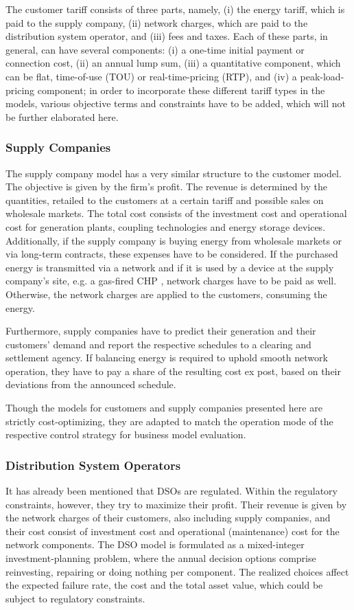 \documentclass[review]{elsarticle}
\begin{document}
The customer tariff consists of three parts, namely, (i) the energy
tariff, which is paid to the supply company, (ii) network charges,
which are paid to the distribution system operator, and (iii) fees and
taxes. Each of these parts, in general, can have several components:
(i) a one-time initial payment or connection cost, (ii) an annual lump
sum, (iii) a quantitative component, which can be flat, time-of-use (TOU) or real-time-pricing (RTP),
and (iv) a peak-load-pricing component; in order to incorporate these
different tariff types in the models, various objective terms and
constraints have to be added, which will not be further elaborated
here. 

\subsubsection{Supply Companies}
The supply company model has a very similar structure to the customer
model. The objective is given by the firm’s profit. The revenue is
determined by the quantities, retailed to the customers at a certain tariff
and possible sales on
wholesale markets.
The
total cost consists of the investment cost and operational cost for
generation plants, coupling technologies and energy storage
devices. Additionally, if the supply company is buying energy from
wholesale markets or via long-term contracts, these expenses have to
be considered. If the purchased energy is transmitted via a network
and if it is used by a device at the supply company’s site, e.g. a gas-fired CHP
, network charges have to be paid as well. Otherwise, the
network charges are applied to the customers, consuming the energy. 

Furthermore, supply companies have to predict their generation and
their customers’ demand and report the respective schedules to a
clearing and settlement agency. If balancing energy is required to
uphold smooth network operation, they have to pay a share of the
resulting cost ex post, based on their deviations from the announced
schedule. 

Though the models for customers and supply companies presented here
are strictly cost-optimizing, they are adapted to match the operation
mode of the respective control strategy for business model
evaluation. 

\subsubsection{Distribution System Operators}
It has already been mentioned that DSOs are regulated. Within the
regulatory constraints, however, they try to maximize their
profit. Their revenue is given by the network charges of their
customers, also including supply companies, and their cost consist of
investment cost and operational (maintenance) cost for the network
components. The DSO model is formulated as a mixed-integer
investment-planning problem, where the annual decision options
comprise reinvesting, repairing or doing nothing per component. The
realized choices affect the expected failure rate, the cost and the
total asset value, which could be subject to regulatory constraints. 
\end{document}
